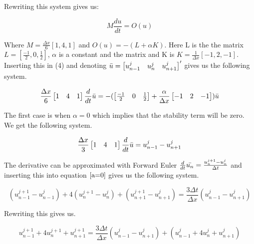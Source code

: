 \documentclass[a4paper,10pt,twoside]{article}
\begin{document}
Rewriting this system gives us:

\begin{equation}
    M\frac{du}{dt} = O(u)
\end{equation}

Where $M = \frac{\Delta x}{6}[1, 4, 1]$ and $O(u) = -(L+\alpha K)$. Here L is the the matrix $L = [\frac{-1}{2}, 0, \frac{1}{2}]$, $\alpha$ is a constant and the matrix and K is $K = \frac{1}{\Delta x}[-1, 2, -1]$. Inserting this in (4) and denoting $\Bar{u} = \begin{bmatrix} u_{n-1}^j & u_{n}^j & u_{n+1}^j \end{bmatrix}'$ gives us the following system.

\begin{equation}
    \frac{\Delta x}{6}
    \begin{bmatrix}
        1 & 4 & 1
    \end{bmatrix}    
    \frac{d}{dt} \Bar{u} =
    -(\begin{bmatrix}
        \frac{-1}{2} & 0 & \frac{1}{2}
    \end{bmatrix}
    + \frac{\alpha}{\Delta x} 
    \begin{bmatrix}
        -1 & 2 & -1
    \end{bmatrix})
    \Bar{u}
\end{equation}

The first case is when $\alpha = 0$ which implies that the stability term will be zero. We get the following system.

\begin{equation}
\label{a=0}
        \frac{\Delta x}{3}
    \begin{bmatrix}
        1 & 4 & 1
    \end{bmatrix}    
    \frac{d}{dt} \Bar{u} = u_{n-1}^{j} - u_{n+1}^{j}
\end{equation}

The derivative can be approximated with Forward Euler $\frac{d}{dt} \Bar{u_{n}} = \frac{u_n^{j+1} - u_n^j}{\Delta t}$ and inserting this into equation $\ref{a=0}$ gives us the following system.

\begin{equation}
        (u_{n-1}^{j+1} - u_{n-1}^j)
        +4(u_n^{j+1} - u_n^j)
        +(u_{n+1}^{j+1} - u_{n+1}^j)
    = \frac{3 \Delta t}{\Delta x}\left(u_{n-1}^{j} - u_{n+1}^{j}\right)
\end{equation}

Rewriting this gives us.

\begin{equation}
        u_{n-1}^{j+1}
        +4u_n^{j+1} 
        +u_{n+1}^{j+1}
    = \frac{3 \Delta t}{\Delta x}\left(u_{n-1}^{j} - u_{n+1}^{j}\right) + (u_{n-1}^j + 4u_n^j + u_{n+1}^j)
\end{equation}
\end{document}
